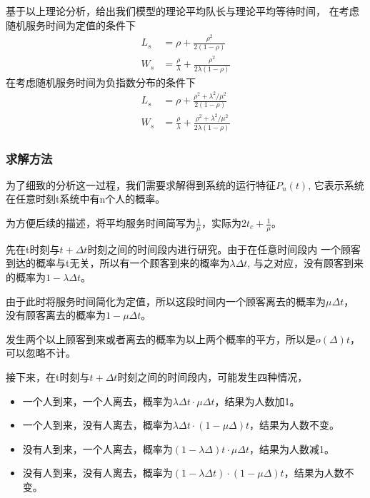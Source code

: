     基于以上理论分析，给出我们模型的理论平均队长与理论平均等待时间，
    在考虑随机服务时间为定值的条件下
    \begin{equation}
        \begin{aligned}
            L_s & =\rho +\frac{\rho^2 }{2(1-\rho)} \\
            W_s &=\frac{\rho}{\lambda} +\frac{\rho^2}{2\lambda (1-\rho)}
        \end{aligned}
    \end{equation}
    在考虑随机服务时间为负指数分布的条件下
    \begin{equation}
        \begin{aligned}
            L_s & =\rho +\frac{\rho^2 +\lambda^2 /\mu^2}{2(1-\rho)} \\
            W_s &=\frac{\rho}{\lambda} +\frac{\rho^2 +\lambda^2 /\mu^2}{2\lambda (1-\rho)}
        \end{aligned}
    \end{equation}
\subsubsection{求解方法}
为了细致的分析这一过程，我们需要求解得到系统的运行特征$P_n(t)$,
它表示系统在任意时刻t系统中有n个人的概率。

为方便后续的描述，将平均服务时间简写为$\frac{1}{\mu}$，实际为$2t_c+\frac{1}{\mu}$。

先在t时刻与$t+\Delta t$时刻之间的时间段内进行研究。由于在任意时间段内
一个顾客到达的概率与t无关，所以有一个顾客到来的概率为$\lambda \Delta t$,
与之对应，没有顾客到来的概率为$1- \lambda \Delta t$。

由于此时将服务时间简化为定值，所以这段时间内一个顾客离去的概率为$\mu \Delta t$，
没有顾客离去的概率为$1-\mu \Delta t$。

发生两个以上顾客到来或者离去的概率为以上两个概率的平方，所以是$o(\Delta)t$，可以忽略不计。

接下来，在t时刻与$t+\Delta t$时刻之间的时间段内，可能发生四种情况，
\begin{itemize}
\item 一个人到来，一个人离去，概率为$\lambda \Delta t \cdot \mu \Delta t$，结果为人数加1。
\item 一个人到来，没有人离去，概率为$\lambda \Delta t \cdot (1-\mu \Delta) t$，结果为人数不变。
\item 没有人到来，一个人离去，概率为$(1-\lambda \Delta) t \cdot \mu \Delta t$，结果为人数减1。
\item 没有人到来，没有人离去，概率为$(1-\lambda \Delta t) \cdot (1-\mu \Delta) t$，结果为人数不变。
\end{itemize}


